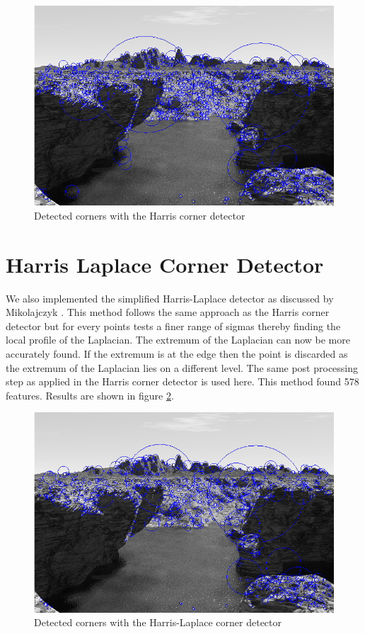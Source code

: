 \documentclass{article}
\begin{document}
\begin{figure}[ht]
\centering
\includegraphics[width=\textwidth]{img/Harris.png}
\caption{Detected corners with the Harris corner detector}
\label{fig:Harris}
\end{figure}

\section{Harris Laplace Corner Detector}

We also implemented the simplified Harris-Laplace detector as discussed by Mikolajczyk \cite{Miko}. This method follows the same approach as the Harris corner detector but for every points tests a finer range of sigmas thereby finding the local profile of the Laplacian. The extremum of the Laplacian can now be more accurately found. If the extremum is at the edge then the point is discarded as the extremum of the Laplacian lies on a different level. The same post processing step as applied in the Harris corner detector is used here. This method found 578 features. Results are shown in figure \ref{fig:HL}.


\begin{figure}[ht]
\centering
\includegraphics[width=\textwidth]{img/HarrisLaplace.png}
\caption{Detected corners with the Harris-Laplace corner detector}
\label{fig:HL}
\end{figure}
\end{document}
